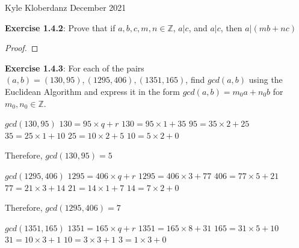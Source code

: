 \documentclass[a4paper]{article}
\begin{document}
\begin{myparindent}{0pt}

Kyle Kloberdanz  December 2021 \newline

\textbf{Exercise 1.4.2}:
Prove that if $a, b, c, m, n \in \mathbb{Z}$, $a|c$, and $a|c$, then $a|(mb + nc)$
\begin{proof}
\end{proof}

\textbf{Exercise 1.4.3}:
For each of the pairs $(a, b) = (130, 95), (1295, 406), (1351, 165)$, find $gcd(a, b)$
using the Euclidean Algorithm and express it in the form $gcd(a, b) = m_0 a + n_0 b$
for $m_0, n_0 \in \mathbb{Z}$. \newline

$gcd(130, 95)$ \newline
$130 = 95 \times q + r$ \newline
$130 = 95 \times 1 + 35$ \newline
$95 = 35 \times 2 + 25$ \newline
$35 = 25 \times 1 + 10$ \newline
$25 = 10 \times 2 + 5$ \newline
$10 = 5 \times 2 + 0$ \newline

Therefore, $gcd(130, 95) = 5$ \newline

$gcd(1295, 406)$ \newline
$1295 = 406 \times q + r$ \newline
$1295 = 406 \times 3 + 77$ \newline
$406 = 77 \times 5 + 21$ \newline
$77 = 21 \times 3 + 14$ \newline
$21 = 14 \times 1 + 7$ \newline
$14 = 7 \times 2 + 0$ \newline

Therefore, $gcd(1295, 406) = 7$ \newline

$gcd(1351, 165)$ \newline
$1351 = 165 \times q + r$ \newline
$1351 = 165 \times 8 + 31$ \newline
$165 = 31 \times 5 + 10$ \newline
$31 = 10 \times 3 + 1$ \newline
$10 = 3 \times 3 + 1$ \newline
$3 = 1 \times 3 + 0$ \newline


\end{myparindent}
\end{document}
